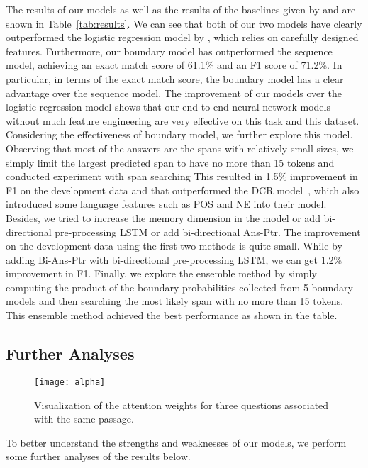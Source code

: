 \documentclass{article} \usepackage{iclr2017_conference,times}
\begin{document}
The results of our models as well as the results of the baselines given by \citet{rajpurkar2016squad} and \citet{Yu2015rank:arxiv} are shown in Table~\ref{tab:results}.
We can see that both of our two models have clearly outperformed the logistic regression model by \citet{rajpurkar2016squad}, which relies on carefully designed features.
Furthermore, our boundary model has outperformed the sequence model, achieving an exact match score of 61.1\% and an F1 score of 71.2\%. 
In particular, in terms of the exact match score, the boundary model has a clear advantage over the sequence model.
The improvement of our models over the logistic regression model shows that our end-to-end neural network models without much feature engineering are very effective on this task and this dataset.
Considering the effectiveness of boundary model, we further explore this model. 
Observing that most of the answers are the spans with relatively small sizes, we simply limit the largest predicted span to have no more than 15 tokens and conducted experiment with span searching
This resulted in 1.5\% improvement in F1 on the development data and that outperformed the DCR model~\citep{Yu2015rank:arxiv}, which also introduced some language features such as POS and NE into their model. 
Besides, we tried to increase the memory dimension  in the model or add bi-directional pre-processing LSTM or add bi-directional Ans-Ptr. 
The improvement on the development data using the first two methods is quite small. 
While by adding Bi-Ans-Ptr with bi-directional pre-processing LSTM, we can get 1.2\% improvement in F1. 
Finally, we explore the ensemble method by simply computing the product of the boundary probabilities collected from 5 boundary models and then searching the most likely span with no more than 15 tokens.
This ensemble method achieved the best performance as shown in the table.

\subsection{Further Analyses}


\begin{figure}[]
	\centering
	\texttt{[image: alpha]}
	\caption{Visualization of the attention weights  for three questions associated with the same passage.  }
	\label{fig:alpha}
\end{figure}		

To better understand the strengths and weaknesses of our models, we perform some further analyses of the results below.
\end{document}
